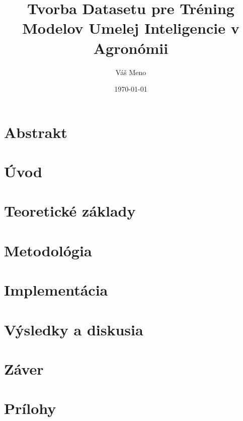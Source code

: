 \documentclass[12pt,a4paper]{report}
\title{Tvorba Datasetu pre Tréning Modelov Umelej Inteligencie v Agronómii}
\author{Váš Meno}
\date{\today}
\begin{document}
\maketitle

\chapter*{Abstrakt}


\tableofcontents

\chapter{Úvod}


\chapter{Teoretické základy}


\chapter{Metodológia}


\chapter{Implementácia}


\chapter{Výsledky a diskusia}


\chapter{Záver}


\printbibliography

\appendix
\chapter{Prílohy}

\end{document}
